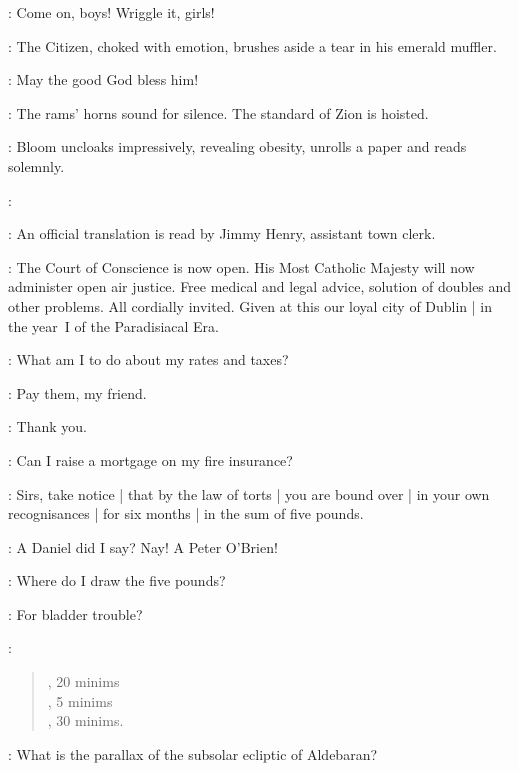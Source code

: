 \Bloom:
Come on,
boys!
Wriggle it,
girls!

:
The Citizen,
choked with emotion,
brushes aside a tear in his emerald muffler.

\Citizen:
May the good God bless him!

:
The rams' horns sound for silence.
The standard of Zion is hoisted.%

:
Bloom uncloaks impressively,
revealing obesity,
unrolls a paper and reads solemnly.

\Bloom:

:
An official translation is read by Jimmy Henry,
assistant town clerk.

\JimmyHenry:
The Court of Conscience is now open.
His Most Catholic Majesty will now administer open air justice.
Free medical and legal advice,
solution of doubles and other problems.
All cordially invited.
Given at this our loyal city of Dublin |
in the year~I of the Paradisiacal Era.

\PaddyLeonard[1]:
What am I to do about my rates and taxes?

\Bloom:
Pay them,
my friend.

\PaddyLeonard[1]:
Thank you.

\NoseyFlynn[2]:
Can I raise a mortgage on my fire insurance?%

\Bloom:
Sirs,
take notice |
that by the law of torts |
you are bound over |
in your own recognisances |
for six months |
in the sum of five pounds.

\JJOM[1]:
A Daniel did I say?
Nay!
A Peter O'Brien!

\NoseyFlynn[2]:
Where do I draw the five pounds?

\begin{omitted}
\PisserBurke:
For bladder trouble?

\Bloom:
\begin{verse}
, 20 minims\\
, 5 minims\\
, 30 minims.\\
\end{verse}
\end{omitted}

\ChrisCallinan[1]:
What is the parallax of the subsolar ecliptic of Aldebaran?


